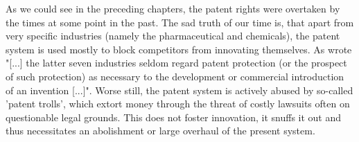 \documentclass[a4paper]{report}
\begin{document}
As we could see in the preceding chapters, the patent rights were overtaken by the times at some point in the past. The sad truth of our time is, that apart from very specific industries (namely the pharmaceutical and chemicals), the patent system is used mostly to block competitors from innovating themselves. As \citeauthor{Mansfield1986} wrote "[...] the latter seven industries seldom regard patent protection (or the prospect of such protection) as necessary to the development or commercial introduction of an invention [...]". Worse still, the patent system is actively abused by so-called 'patent trolls', which extort money through the threat of costly lawsuits often on questionable legal grounds. This does not foster innovation, it snuffs it out and thus necessitates an abolishment or large overhaul of the present system.

\newpage

\printbibliography
\end{document}
